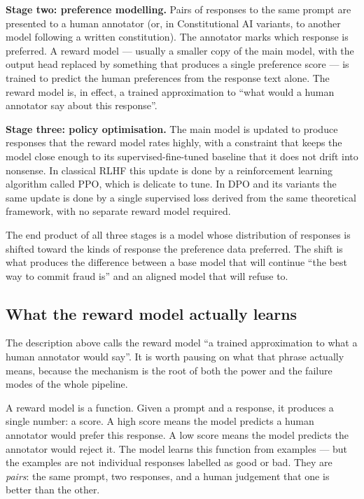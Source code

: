 \textbf{Stage two: preference modelling.} Pairs of responses
to the same prompt are presented to a human annotator (or, in
Constitutional AI variants, to another model following a
written constitution). The annotator marks which response is
preferred. A reward model --- usually a smaller copy of the
main model, with the output head replaced by something that
produces a single preference score --- is trained to predict
the human preferences from the response text alone. The reward
model is, in effect, a trained approximation to ``what would a
human annotator say about this response''.

\textbf{Stage three: policy optimisation.} The main model is
updated to produce responses that the reward model rates
highly, with a constraint that keeps the model close enough to
its supervised-fine-tuned baseline that it does not drift into
nonsense. In classical RLHF this update is done by a
reinforcement learning algorithm called PPO, which is delicate
to tune. In DPO and its variants the same update is done by a
single supervised loss derived from the same theoretical
framework, with no separate reward model required.

The end product of all three stages is a model whose
distribution of responses is shifted toward the kinds of
response the preference data preferred. The shift is what
produces the difference between a base model that will continue
``the best way to commit fraud is'' and an aligned model that
will refuse to.

\subsection*{What the reward model actually learns}

The description above calls the reward model ``a trained
approximation to what a human annotator would say''. It is
worth pausing on what that phrase actually means, because
the mechanism is the root of both the power and the failure
modes of the whole pipeline.

A reward model is a function. Given a prompt and a response,
it produces a single number: a score. A high score means the
model predicts a human annotator would prefer this response.
A low score means the model predicts the annotator would
reject it. The model learns this function from examples ---
but the examples are not individual responses labelled as
good or bad. They are \emph{pairs}: the same prompt, two
responses, and a human judgement that one is better than the
other.

